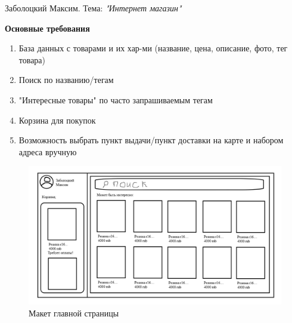 \documentclass[a4paper, twoside] {report}
\begin{document}
	
	Заболоцкий Максим. Тема: \emph{"Интернет магазин"}
	
	\textbf{Основные требования}
	
	\begin{enumerate}
		\item База данных с товарами и их хар-ми (название, цена, описание, фото, тег товара)
		\item Поиск по названию/тегам
		\item "Интересные товары" по часто запрашиваемым тегам
		\item Корзина для покупок
		\item Возможность выбрать пункт выдачи/пункт доставки на карте и набором адреса вручную
	\end{enumerate}
	\begin{figure}[h]
		\centering
		\includegraphics[width=0.8\linewidth]{"home page layout"}
		\caption[]{Макет главной страницы}
	\end{figure}
	
\end{document}
